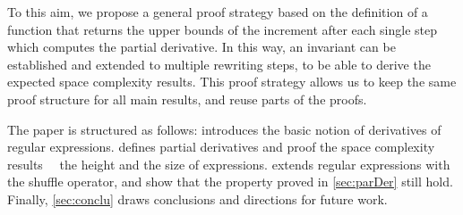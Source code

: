 To this aim, we propose a general proof strategy based on the definition of a function that returns the upper bounds of the increment after each single step which computes the partial derivative. In this way, an invariant can be established and extended to multiple rewriting steps, to be able to derive the expected space complexity results.  This proof strategy allows us to keep the same proof structure for all main results, and reuse parts of the proofs.

The paper is structured as follows:  introduces the basic notion of derivatives of regular expressions.  defines partial derivatives and proof the space complexity results ~\wrt~the height and the size of expressions.
 extends regular expressions with the shuffle operator, and show that the property proved in \cref{sec:parDer} still hold. Finally, \cref{sec:conclu} draws conclusions and directions for future work.

